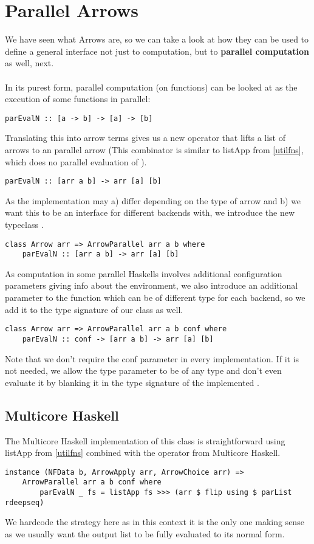 \section{Parallel Arrows}
We have seen what Arrows are, so we can take a look at how they can be used to define a general interface not just to computation, but to \textbf{parallel computation} as well, next.
\\\\
In its purest form, parallel computation (on functions) can be looked at as the execution of some functions  in parallel:
\begin{lstlisting}[frame=htrbl]
parEvalN :: [a -> b] -> [a] -> [b]
\end{lstlisting}
Translating this into arrow terms gives us a new operator  that lifts a list of arrows \code{[arr a b]} to an parallel arrow  (This combinator is similar to listApp from \ref{utilfns}, which does no parallel evaluation of \code{[arr a b]}).
\begin{lstlisting}[frame=htrbl]
parEvalN :: [arr a b] -> arr [a] [b]
\end{lstlisting}
As the implementation may a) differ depending on the type of arrow and b) we want this to be an interface for different backends with, we introduce the new typeclass .
\begin{lstlisting}[frame=htrbl]
class Arrow arr => ArrowParallel arr a b where
	parEvalN :: [arr a b] -> arr [a] [b]
\end{lstlisting}
As computation in some parallel Haskells involves additional configuration parameters giving info about the environment, we also introduce an additional  parameter to the function which can be of different type for each backend, so we add it to the type signature of our class as well.
\begin{lstlisting}[frame=htrbl]
class Arrow arr => ArrowParallel arr a b conf where
	parEvalN :: conf -> [arr a b] -> arr [a] [b]
\end{lstlisting}
Note that we don't require the conf parameter in every implementation. If it is not needed, we allow the  type parameter to be of any type and don't even evaluate it by blanking it in the type signature of the implemented .

\subsection{Multicore Haskell}
The Multicore Haskell implementation of this class is straightforward using listApp from \ref{utilfns} combined with the  operator from Multicore Haskell.
\begin{lstlisting}[frame=htrbl]
instance (NFData b, ArrowApply arr, ArrowChoice arr) =>
	ArrowParallel arr a b conf where
		parEvalN _ fs = listApp fs >>> (arr $ flip using $ parList rdeepseq)
\end{lstlisting}
We hardcode the  strategy here as in this context it is the only one making sense as we usually want the output list to be fully evaluated to its normal form.

